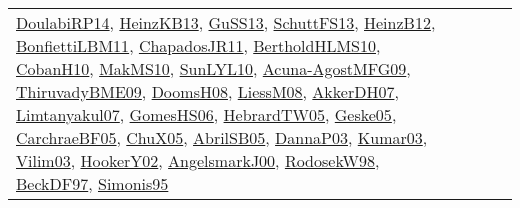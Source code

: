 {\begin{longtable}{lp{3cm}>{\raggedright}p{6cm}>{\raggedright}p{6cm}p{8cm}}
\href{papers/DoulabiRP14.pdf}{DoulabiRP14}\cite{DoulabiRP14}, \href{papers/HeinzKB13.pdf}{HeinzKB13}\cite{HeinzKB13}, \href{papers/GuSS13.pdf}{GuSS13}\cite{GuSS13}, \href{papers/SchuttFS13.pdf}{SchuttFS13}\cite{SchuttFS13}, \href{papers/HeinzB12.pdf}{HeinzB12}\cite{HeinzB12}, \href{papers/BonfiettiLBM11.pdf}{BonfiettiLBM11}\cite{BonfiettiLBM11}, \href{papers/ChapadosJR11.pdf}{ChapadosJR11}\cite{ChapadosJR11}, \href{papers/BertholdHLMS10.pdf}{BertholdHLMS10}\cite{BertholdHLMS10}, \href{papers/CobanH10.pdf}{CobanH10}\cite{CobanH10}, \href{papers/MakMS10.pdf}{MakMS10}\cite{MakMS10}, \href{papers/SunLYL10.pdf}{SunLYL10}\cite{SunLYL10}, \href{papers/Acuna-AgostMFG09.pdf}{Acuna-AgostMFG09}\cite{Acuna-AgostMFG09}, \href{papers/ThiruvadyBME09.pdf}{ThiruvadyBME09}\cite{ThiruvadyBME09}, \href{papers/DoomsH08.pdf}{DoomsH08}\cite{DoomsH08}, \href{articles/LiessM08.pdf}{LiessM08}\cite{LiessM08}, \href{papers/AkkerDH07.pdf}{AkkerDH07}\cite{AkkerDH07}, \href{papers/Limtanyakul07.pdf}{Limtanyakul07}\cite{Limtanyakul07}, \href{papers/GomesHS06.pdf}{GomesHS06}\cite{GomesHS06}, \href{papers/HebrardTW05.pdf}{HebrardTW05}\cite{HebrardTW05}, \href{papers/Geske05.pdf}{Geske05}\cite{Geske05}, \href{papers/CarchraeBF05.pdf}{CarchraeBF05}\cite{CarchraeBF05}, \href{papers/ChuX05.pdf}{ChuX05}\cite{ChuX05}, \href{papers/AbrilSB05.pdf}{AbrilSB05}\cite{AbrilSB05}, \href{papers/DannaP03.pdf}{DannaP03}\cite{DannaP03}, \href{papers/Kumar03.pdf}{Kumar03}\cite{Kumar03}, \href{papers/Vilim03.pdf}{Vilim03}\cite{Vilim03}, \href{papers/HookerY02.pdf}{HookerY02}\cite{HookerY02}, \href{papers/AngelsmarkJ00.pdf}{AngelsmarkJ00}\cite{AngelsmarkJ00}, \href{papers/RodosekW98.pdf}{RodosekW98}\cite{RodosekW98}, \href{papers/BeckDF97.pdf}{BeckDF97}\cite{BeckDF97}, \href{papers/Simonis95.pdf}{Simonis95}\cite{Simonis95}\\

\end{longtable}}
